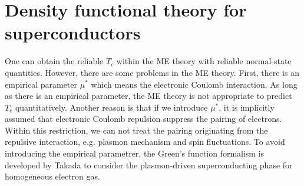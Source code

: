 

\section{Density functional theory for superconductors}

One can obtain the reliable $T_c$ within the ME theory with reliable normal-state quantities.
However, there are some problems in the ME theory. First, there is an empirical parameter $\mu^{\ast}$
which means the electronic Coulomb interaction. As long as there is an empirical parameter, 
the ME theory is not appropriate to predict $T_c$ quantitatively.
Another reason is that if we introduce $\mu^{\ast}$, it is implicitly assumed that electronic
Coulomb repulsion suppress the pairing of electrons. Within this restriction, we can not treat the
pairing originating from the repulsive interaction, e.g. plasmon mechanism and spin fluctuations.
To avoid introducing the empirical parametrer, the Green's function formalism is developed by Takada
\cite{Takada1978plasmon} to consider the plasmon-driven superconducting phase for homogeneous electron gas.

